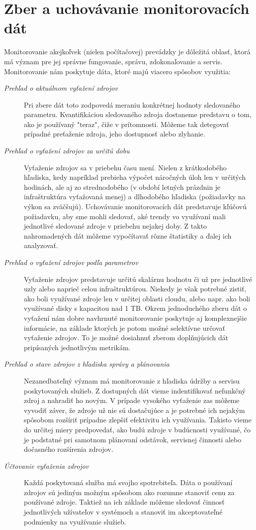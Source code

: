 \documentclass[printed,11pt,twoside,color,cover,table]{fithesis3}
\begin{document}
\chapter{Zber a uchovávanie monitorovacích dát}
Monitorovanie akejkoľvek (nielen počítačovej) prevádzky je dôležitá oblasť, ktorá má význam pre jej správne fungovanie, správu, zdokonaľovanie a servis. Monitorovanie nám poskytuje dáta, ktoré majú viacero 
spôsobov využitia:
\begin{description}
\item[\emph{Prehľad o aktuálnom vyťažení zdrojov}]
Pri zbere dát toto zodpovedá meraniu konkrétnej hodnoty sledovaného parametru. Kvantifikáciou sledovaného zdroja dostaneme predstavu o tom, ako je používaný "teraz", čiže v prítomnosti. Môžeme tak detegovať prípadné
preťaženie zdroja, jeho dostupnosť alebo zlyhanie.
\item[\emph{Prehľad o vyťažení zdrojov za určitú dobu}]
Vyťaženie zdrojov sa v priebehu času mení. Nielen z krátkodobého hľadiska, kedy napríklad prebieha výpočet náročných úloh len v určitých hodinách, ale aj zo strednodobého (v období letných prázdnin je infraštruktúra 
vyťažovaná menej) a dlhodobého hľadiska (požiadavky na výkon sa zväčšujú). Uchovávanie monitorovacích dát predstavuje kľúčovú požiadavku, aby sme mohli sledovať, aké trendy vo využívaní mali jednotlivé sledované zdroje v priebehu nejakej doby.
Z takto nahromadených dát môžeme vypočítavať rôzne štatistiky a ďalej ich analyzovať.
\item[\emph{Prehľad o vyťažení zdrojov podľa parametrov}]
Vyťaženie zdrojov predstavuje určitú skalárnu hodnotu či už pre jednotlivé uzly alebo naprieč celou infraštruktúrou. Niekedy je však potrebné zistiť, ako boli využívané zdroje len v určitej oblasti cloudu,
alebo napr. ako boli využívané disky s kapacitou nad 1 TB. Okrem jednoduchého zberu dát o vyťažení nám dobre navhrnuté monitorovanie poskytuje aj komplexnejšie informácie, na základe ktorých je potom možné
selektívne určovať vyťaženie zdrojov. To je možné dosiahnuť zberom doplňujúcich dát pripísaných jednotlivým metrikám.
\item[\emph{Prehľad o stave zdrojov z hľadiska správy a plánovania}]
Nezanedbateľný význam má monitorovanie z hľadiska údržby a servisu poskytovaných služieb. Z dostupných dát vieme indentifikovať nefunkčný zdroj a nahradiť ho novým. V prípade vysokého vyťaženie zas môžeme vyvodiť záver, že zdroje už nie sú
dostačujúce a je potrebné ich nejakým spôsobom rozšíriť prípadne zlepšiť efektivitu ich využívania. Takisto vieme do určitej miery predpovedať, ako budú zdroje v budúcnosti využívané, čo je podstatné pri samotnom plánovaní 
odstávok, servisnej činnosti alebo dočasného rozšírenia zdrojov.
\item[\emph{Účtovanie vyťaženia zdrojov}]
Každá poskytovaná služba má svojho spotrebiteľa. Dáta o používaní zdrojov sú jediným možným spôsobom ako rozumne stanoviť cenu za používané zdroje.
Taktiež na ich základe môžeme sledovať činnosť jednotlivých užívateľov v systémoch a stanoviť im akceptovateľné podmienky na využívanie služieb.
\end{description}
\end{document}
